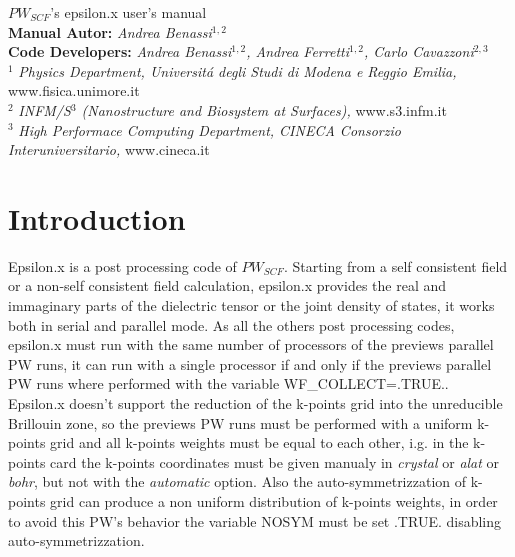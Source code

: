\documentclass[twocolumn]{article}
\begin{document}
\begin{titlepage}
\Huge
\begin{center}
$PW_{SCF}$'s epsilon.x user's manual\\[4.5cm]
\normalsize
\vspace{10.5cm}
\textbf{Manual Autor:}
\emph{Andrea Benassi}$^{1,2}$\\[0.3cm]
\textbf{Code Developers:}
\emph{Andrea Benassi$^{1,2}$, Andrea Ferretti$^{1,2}$, Carlo Cavazzoni$^{2,3}$}\\[1cm]
$^{1}$ \emph{Physics Department, Universit\'a degli Studi di Modena e Reggio Emilia,} www.fisica.unimore.it\\
$^{2}$ \emph{INFM/S$^{3}$ (Nanostructure and Biosystem at Surfaces),} www.s3.infm.it\\
$^{3}$ \emph{High Performace Computing Department, CINECA Consorzio Interuniversitario,} www.cineca.it\\
\end{center}
\end{titlepage}
\newpage
\section{Introduction}
Epsilon.x is a post processing code of $PW_{SCF}$. Starting from a self consistent field or a non-self consistent field calculation,
epsilon.x provides the real and immaginary parts of the dielectric tensor or the joint density of states, it works both in serial and
parallel mode. As all the others post processing codes, epsilon.x must run with the same number of
processors of the previews parallel PW runs, it can run with a single processor if and only if the previews parallel PW runs where
performed with the
variable WF\_COLLECT=.TRUE..\\
Epsilon.x doesn't support the reduction of the k-points grid into the unreducible Brillouin zone, so the previews PW runs must be
performed with a uniform k-points grid and all k-points weights must be equal to each other, i.g. in the k-points card the k-points
coordinates must be given manualy in \emph{crystal} or \emph{alat} or \emph{bohr}, but not with the \emph{automatic} option. Also the
auto-symmetrizzation of k-points grid can produce a non uniform distribution of k-points weights, in order to avoid this
PW's behavior the variable NOSYM must be set .TRUE. disabling auto-symmetrizzation.
\end{document}
